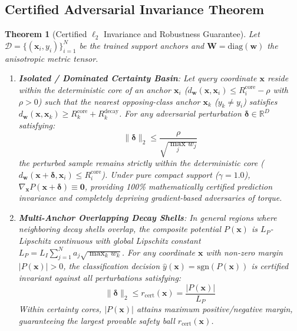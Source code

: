 \documentclass[preprint,review,12pt]{elsarticle}
\newtheorem{theorem}{Theorem}
\begin{document}
\subsection{Certified Adversarial Invariance Theorem}
\begin{theorem}[Certified $\ell_2$ Invariance and Robustness Guarantee]
\label{thm:robustness}
Let $\mathcal{D} = \{(\mathbf{x}_i, y_i)\}_{i=1}^N$ be the trained support anchors and $\mathbf{W} = \mathrm{diag}(\mathbf{w})$ the anisotropic metric tensor.
\begin{enumerate}
    \item \textbf{Isolated / Dominated Certainty Basin}: Let query coordinate $\mathbf{x}$ reside within the deterministic core of an anchor $\mathbf{x}_i$ ($d_{\mathbf{w}}(\mathbf{x}, \mathbf{x}_i) \le R_i^{\mathrm{core}} - \rho$ with $\rho > 0$) such that the nearest opposing-class anchor $\mathbf{x}_k$ ($y_k \ne y_i$) satisfies $d_{\mathbf{w}}(\mathbf{x}, \mathbf{x}_k) \ge R_k^{\mathrm{core}} + R_k^{\mathrm{decay}}$. For any adversarial perturbation $\boldsymbol{\delta} \in \mathbb{R}^D$ satisfying:
    \begin{equation}
    \|\boldsymbol{\delta}\|_2 \le \frac{\rho}{\sqrt{\max_{j} w_j}}
    \end{equation}
    the perturbed sample remains strictly within the deterministic core ($d_{\mathbf{w}}(\mathbf{x} + \boldsymbol{\delta}, \mathbf{x}_i) \le R_i^{\mathrm{core}}$). Under pure compact support ($\gamma = 1.0$), $\nabla_{\mathbf{x}} P(\mathbf{x} + \boldsymbol{\delta}) \equiv \mathbf{0}$, providing 100\% mathematically certified prediction invariance and completely depriving gradient-based adversaries of torque.
    \item \textbf{Multi-Anchor Overlapping Decay Shells}: In general regions where neighboring decay shells overlap, the composite potential $P(\mathbf{x})$ is $L_P$-Lipschitz continuous with global Lipschitz constant $L_P = L_I \sum_{j=1}^N a_j \sqrt{\max_k w_k}$. For any coordinate $\mathbf{x}$ with non-zero margin $|P(\mathbf{x})| > 0$, the classification decision $\hat{y}(\mathbf{x}) = \mathrm{sgn}(P(\mathbf{x}))$ is certified invariant against all perturbations satisfying:
    \begin{equation}
    \|\boldsymbol{\delta}\|_2 \le r_{\mathrm{cert}}(\mathbf{x}) = \frac{|P(\mathbf{x})|}{L_P}
    \end{equation}
    Within certainty cores, $|P(\mathbf{x})|$ attains maximum positive/negative margin, guaranteeing the largest provable safety ball $r_{\mathrm{cert}}(\mathbf{x})$.
\end{enumerate}
\end{theorem}
\end{document}
